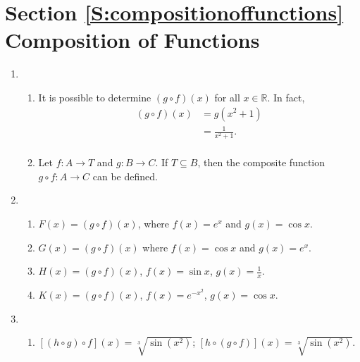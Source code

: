 \section*{Section \ref{S:compositionoffunctions} Composition of Functions}

\begin{enumerate}
\item \begin{enumerate}
\item It is possible to determine $\left( {g \circ f} \right)\left( x \right)$  for all  
$x \in \mathbb{R}$.  In fact,
\[
\begin{aligned}
\left( {g \circ f} \right)\left( x \right) &= g \left( x^2 + 1 \right) \\
                                           &= \frac{1}{x^2 + 1}. \\
\end{aligned}
\]
\item Let  $f:A \to T$ and  $g:B \to C$.  If $T \subseteq B$, then the composite function 
$g \circ f:A \to C$ can be defined.
\end{enumerate}



\item \begin{enumerate}
\item $F\left( x \right) = \left( {g \circ f} \right)\left( x \right)$, where 
$f\left( x \right) = e^x$  and $g\left( x \right) = \cos x$.

\item $G\left( x \right) = \left( {g \circ f} \right)\left( x \right)$ where 
$f\left( x \right) = \cos x$ and $g\left( x \right) = e^x $.

\item $H\left( x \right) = \left( {g \circ f} \right)\left( x \right)$, 
$f\left( x \right) = \sin x$, $g\left( x \right) = \frac{1}{x}$.

\item $K\left( x \right) = \left( {g \circ f} \right)\left( x \right)$, 
$f\left( x \right) = e^{-x^2}$, $g\left( x \right) = \cos x$.
\end{enumerate}



\item \begin{enumerate}
\item $\left[ {\left( {h \circ g} \right) \circ f} \right]\left( x \right) = \sqrt[3]{{\sin \left( {x^2 } \right)}}$; 
$\left[ {h \circ \left( {g \circ f} \right)} \right]\left( x \right) = \sqrt[3]{{\sin \left( {x^2 } \right)}}$.


\end{enumerate}
\end{enumerate}
